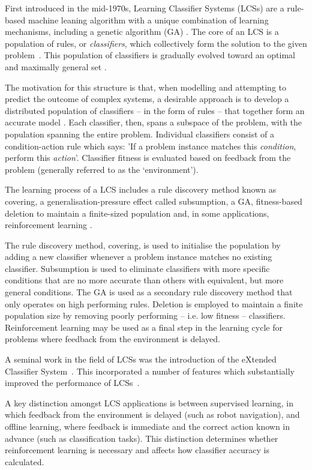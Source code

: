 \documentclass[11pt]{article}
\begin{document}
First introduced in the mid-1970s, Learning Classifier Systems (LCSs) are a rule-based machine leaning algorithm with a unique combination of learning mechanisms, including a genetic algorithm (GA) \cite{Butz2015}. The core of an LCS is a population of rules, or \textit{classifiers}, which collectively form the solution to the given problem~\cite{Urbanowicz2009}. This population of classifiers is gradually evolved toward an optimal and maximally general set \cite{Urbanowicz2009}.

The motivation for this structure is that, when modelling and attempting to predict the outcome of complex systems, a desirable approach is to develop a distributed population of classifiers -- in the form of rules -- that together form an accurate model \cite[p.~2]{Urbanowicz2009}. Each classifier, then, spans a subspace of the problem, with the population spanning the entire problem. Individual classifiers consist of a condition-action rule which says: 'If a problem instance matches this \textit{condition}, perform this \textit{action}'. Classifier fitness is evaluated based on feedback from the problem (generally referred to as the `environment').

The learning process of a LCS includes a rule discovery method known as covering, a generalisation-pressure effect called subsumption, a GA, fitness-based deletion to maintain a finite-sized population and, in some applications, reinforcement learning \cite{Butz2000}.

The rule discovery method, covering, is used to initialise the population by adding a new classifier whenever a problem instance matches no existing classifier. Subsumption is used to eliminate classifiers with more specific conditions that are no more accurate than others with equivalent, but more general conditions. The GA is used as a secondary rule discovery method that only operates on high performing rules. Deletion is employed to maintain a finite population size by removing poorly performing -- i.e. low fitness -- classifiers. Reinforcement learning may be used as a final step in the learning cycle for problems where feedback from the environment is delayed.

A seminal work in the field of LCSs was the introduction of the eXtended Classifier System~\cite{Lanzi2008,Sigaud2007}. This incorporated a number of features which substantially improved the performance of LCSs~\cite{Lanzi2008}.

A key distinction amongst LCS applications is between supervised learning, in which feedback from the environment is delayed (such as robot navigation), and offline learning, where feedback is immediate and the correct action known in advance (such as classification tasks). This distinction determines whether reinforcement learning is necessary and affects how classifier accuracy is calculated.
\end{document}
